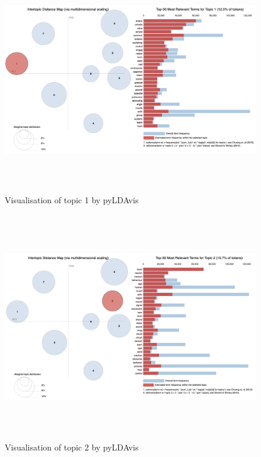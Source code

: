 \begin{figure}[H]
    \centering
    \includegraphics[width = 16cm, height = 10cm]{./img/LDAvis.png}
    \caption{Visualisation of topic 1 by pyLDAvis}
\end{figure}

\begin{figure}[H]
    \centering
    \includegraphics[width = 16cm, height = 10cm]{./img/pylda_topic2.png}
    \caption{Visualisation of topic 2 by pyLDAvis}
\end{figure}

